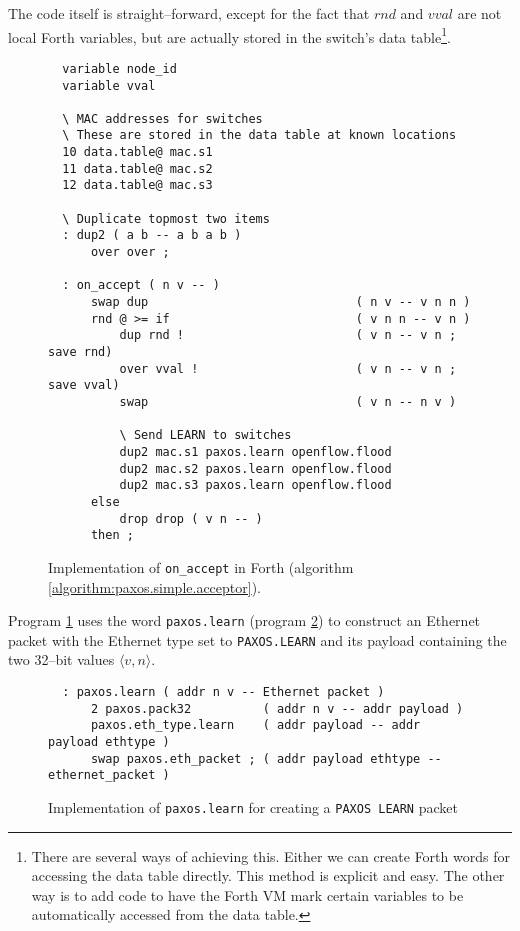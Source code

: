 The code itself is straight--forward, except for the fact that $rnd$ and
$vval$ are not local Forth variables, but are actually stored in the
switch's data table\footnote{There are several ways of achieving this.
Either we can create Forth words for accessing the data table directly.
This method is explicit and easy.  The other way is to add code to have
the Forth VM mark certain variables to be automatically accessed from the
data table.}.

\begin{figure}[H]
  \centering
  \begin{Verbatim}
  variable node_id
  variable vval

  \ MAC addresses for switches
  \ These are stored in the data table at known locations
  10 data.table@ mac.s1
  11 data.table@ mac.s2
  12 data.table@ mac.s3

  \ Duplicate topmost two items
  : dup2 ( a b -- a b a b )
      over over ;

  : on_accept ( n v -- )
      swap dup                             ( n v -- v n n )
      rnd @ >= if                          ( v n n -- v n )
          dup rnd !                        ( v n -- v n ; save rnd)
          over vval !                      ( v n -- v n ; save vval)
          swap                             ( v n -- n v )

          \ Send LEARN to switches
          dup2 mac.s1 paxos.learn openflow.flood
          dup2 mac.s2 paxos.learn openflow.flood
          dup2 mac.s3 paxos.learn openflow.flood
      else
          drop drop ( v n -- )
      then ;
  \end{Verbatim}
  \caption{Implementation of \texttt{on\_{}accept} in Forth
            (algorithm \ref{algorithm:paxos.simple.acceptor}).}
  \label{program:forth.on-accept}
\end{figure}

Program \ref{program:forth.on-accept} 
uses the word \texttt{paxos.learn} (program \ref{program:forth.paxos.learn})
to construct an Ethernet packet with the
Ethernet type set to \texttt{PAXOS.LEARN} and its payload containing the two
32--bit values $\langle v, n \rangle$.

\begin{figure}[H]
  \centering
  \begin{Verbatim}
  : paxos.learn ( addr n v -- Ethernet packet )
      2 paxos.pack32          ( addr n v -- addr payload )
      paxos.eth_type.learn    ( addr payload -- addr payload ethtype )
      swap paxos.eth_packet ; ( addr payload ethtype -- ethernet_packet )
  \end{Verbatim}
  \caption{Implementation of \texttt{paxos.learn} for creating a
    \texttt{PAXOS LEARN} packet}
  \label{program:forth.paxos.learn}
\end{figure}

